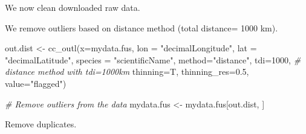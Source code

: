 \documentclass[
]{book}
\newenvironment{Shaded}{\begin{snugshade}}{\end{snugshade}}
\newcommand{\AttributeTok}[1]{\textcolor[rgb]{0.77,0.63,0.00}{#1}}
\newcommand{\CommentTok}[1]{\textcolor[rgb]{0.56,0.35,0.01}{\textit{#1}}}
\newcommand{\DecValTok}[1]{\textcolor[rgb]{0.00,0.00,0.81}{#1}}
\newcommand{\FloatTok}[1]{\textcolor[rgb]{0.00,0.00,0.81}{#1}}
\newcommand{\FunctionTok}[1]{\textcolor[rgb]{0.00,0.00,0.00}{#1}}
\newcommand{\NormalTok}[1]{#1}
\newcommand{\OtherTok}[1]{\textcolor[rgb]{0.56,0.35,0.01}{#1}}
\newcommand{\SpecialCharTok}[1]{\textcolor[rgb]{0.00,0.00,0.00}{#1}}
\newcommand{\StringTok}[1]{\textcolor[rgb]{0.31,0.60,0.02}{#1}}
\begin{document}
We now clean downloaded raw data.

\begin{Shaded}
\end{Shaded}

We remove outliers based on distance method (total distance= 1000 km).

\begin{Shaded}
\begin{Highlighting}[]
\NormalTok{out.dist }\OtherTok{\textless{}{-}} \FunctionTok{cc\_outl}\NormalTok{(}\AttributeTok{x=}\NormalTok{mydata.fus,}
                \AttributeTok{lon =} \StringTok{"decimalLongitude"}\NormalTok{, }\AttributeTok{lat =} \StringTok{"decimalLatitude"}\NormalTok{,}
                \AttributeTok{species =} \StringTok{"scientificName"}\NormalTok{,}
                \AttributeTok{method=}\StringTok{"distance"}\NormalTok{, }\AttributeTok{tdi=}\DecValTok{1000}\NormalTok{, }\CommentTok{\# distance method with tdi=1000km}
                \AttributeTok{thinning=}\NormalTok{T, }\AttributeTok{thinning\_res=}\FloatTok{0.5}\NormalTok{,}
                \AttributeTok{value=}\StringTok{"flagged"}\NormalTok{) }

\CommentTok{\# Remove outliers from the data}
\NormalTok{mydata.fus }\OtherTok{\textless{}{-}}\NormalTok{ mydata.fus[out.dist, ]}
\end{Highlighting}
\end{Shaded}

Remove duplicates.
\end{document}
